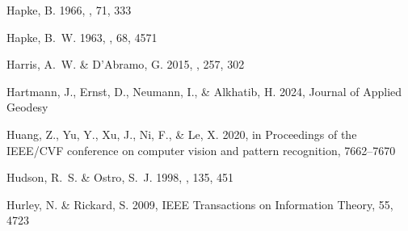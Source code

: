 \begin{thebibliography}{74}
{Hapke}, B. 1966, \aj, 71, 333

{Hapke}, B.~W. 1963, \jgr, 68, 4571

{Harris}, A.~W. \& {D'Abramo}, G. 2015, \icarus, 257, 302

Hartmann, J., Ernst, D., Neumann, I., \& Alkhatib, H. 2024, Journal of Applied Geodesy

Huang, Z., Yu, Y., Xu, J., Ni, F., \& Le, X. 2020, in Proceedings of the IEEE/CVF conference on computer vision and pattern recognition, 7662--7670

{Hudson}, R.~S. \& {Ostro}, S.~J. 1998, \icarus, 135, 451

Hurley, N. \& Rickard, S. 2009, IEEE Transactions on Information Theory, 55, 4723


\end{thebibliography}

